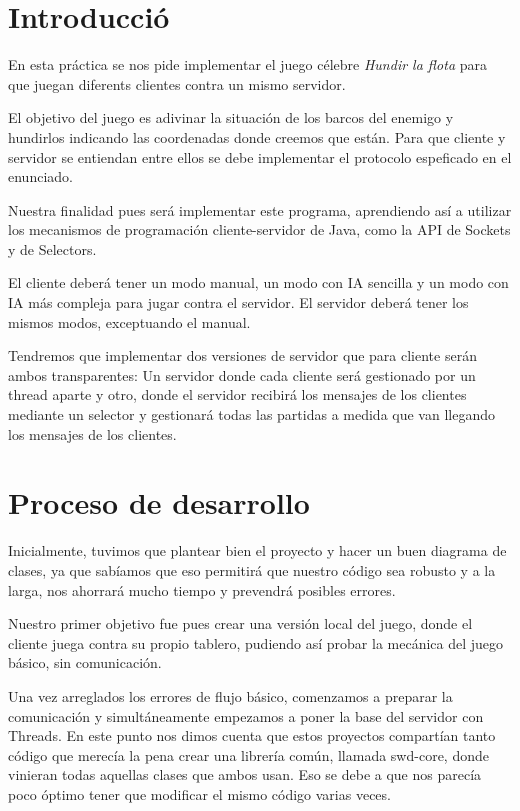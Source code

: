 \section{Introducció}
En esta práctica se nos pide implementar el juego célebre \textit{Hundir la flota} para que juegan diferents clientes contra un mismo servidor.

El objetivo del juego es adivinar la situación de los barcos del enemigo y hundirlos indicando las coordenadas donde creemos que están. Para que cliente y servidor se entiendan entre ellos se debe implementar el protocolo espeficado en el enunciado.

Nuestra finalidad pues será implementar este programa, aprendiendo así a utilizar los mecanismos de programación cliente-servidor de Java, como la API de Sockets y de Selectors.

El cliente deberá tener un modo manual, un modo con IA sencilla y un modo con IA más compleja para jugar contra el servidor. El servidor deberá tener los mismos modos, exceptuando el manual.

Tendremos que implementar dos versiones de servidor que para cliente serán ambos transparentes: Un servidor donde cada cliente será gestionado por un thread aparte y otro, donde el servidor recibirá los mensajes de los clientes mediante un selector y gestionará todas las partidas a medida que van llegando los mensajes de los clientes.

\newpage
\section{Proceso de desarrollo}
Inicialmente, tuvimos que plantear bien el proyecto y hacer un buen diagrama de clases, ya que sabíamos que eso permitirá que nuestro código sea robusto  y a la larga, nos ahorrará mucho tiempo y prevendrá posibles errores.

Nuestro primer objetivo fue pues crear una versión local del juego, donde el cliente juega contra su propio tablero, pudiendo así probar la mecánica del juego básico, sin comunicación.

Una vez arreglados los errores de flujo básico, comenzamos a preparar la comunicación y simultáneamente empezamos a poner la base del servidor con Threads. En este punto nos dimos cuenta que estos proyectos compartían tanto código que merecía la pena crear una librería común, llamada swd-core,  donde vinieran todas aquellas clases que ambos usan. Eso se debe a que nos parecía poco óptimo tener que modificar el mismo código varias veces.

